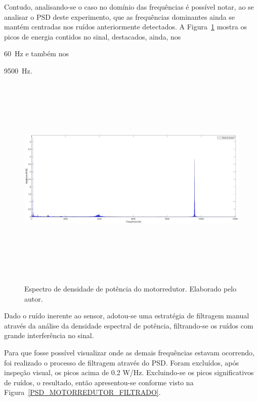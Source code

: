 \documentclass[
	12pt,				
	oneside,			
	a4paper,			
	english,			
	brazil,			
	]{abntex2ppgsi}
\begin{document}
{{{{{Contudo, analisando-se o caso no domínio das frequências é possível notar, ao se analisar o PSD deste experimento, que as frequências dominantes ainda se mantém centradas nos ruídos anteriormente detectados. A Figura~\ref{PSD_MOTORREDUTOR} mostra os picos de energia contidos no sinal, destacados, ainda, nos {\SI{60}{\hertz} e também nos {\SI{9500}{\hertz}.

\begin{figure}[H]
\centering
\caption {Espectro de densidade de potência do motorredutor. Elaborado pelo autor.}
\includegraphics[width=\textwidth,height=100mm,keepaspectratio]{Caso0/PSD_MOTORREDUTOR}
\label{PSD_MOTORREDUTOR}
\end{figure}

Dado o ruído inerente ao sensor, adotou-se uma estratégia de filtragem manual através da análise da densidade espectral de potência, filtrando-se os ruídos com grande interferência no sinal.

Para que fosse possível visualizar onde as demais frequências estavam ocorrendo, foi realizado o processo de filtragem através do PSD. Foram excluídos, após inspeção visual, os picos acima de 0.2 W/Hz. Excluindo-se os picos significativos de ruídos, o resultado, então apresentou-se conforme visto na Figura~\ref{PSD_MOTORREDUTOR_FILTRADO}. 

}}}}}}}
\end{document}
